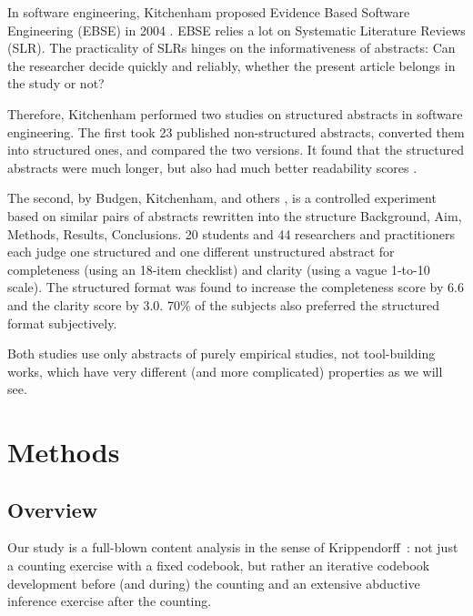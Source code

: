 \documentclass[10pt,journal,compsoc]{IEEEtran}
\begin{document}
In software engineering, Kitchenham proposed
Evidence Based Software Engineering (EBSE) in 2004 \cite{KitDybJor04}.
EBSE relies a lot on Systematic Literature Reviews (SLR).
The practicality of SLRs hinges on the informativeness of abstracts:
Can the researcher decide quickly and reliably, whether the present article
belongs in the study or not?

Therefore, Kitchenham performed two studies on structured abstracts
in software engineering.
The first took 23 published non-structured abstracts, 
converted them into structured ones,
and compared the two versions. 
It found that the structured abstracts were much longer,
but also had much better readability scores \cite{KitBreOwe08}.

The second, by Budgen, Kitchenham, and others \cite{BudKitCha08},
is a controlled experiment based on similar pairs of abstracts
rewritten into the structure 
Background, Aim, Methods, Results, Conclusions.
20 students and 44 researchers and practitioners
each judge one structured and one different unstructured abstract
for completeness (using an 18-item checklist) and 
clarity (using a vague 1-to-10 scale).
The structured format was found to increase the 
completeness score by 6.6 and the clarity score by 3.0.
70\% of the subjects also preferred the structured format
subjectively.

Both studies use only abstracts of purely empirical studies,
not tool-building works, 
which have very different (and more complicated) properties
as we will see.



\section{Methods}


\subsection{Overview}

Our study is a full-blown content analysis in the sense of Krippendorff~\cite{Krippendorff04}:
not just a counting exercise with a fixed codebook,
but rather an iterative codebook development before (and during) the counting
and an extensive abductive inference exercise after the counting.
\end{document}
